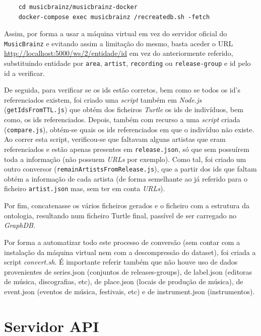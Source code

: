 \documentclass{article}
\begin{document}
\begin{framed}
\begin{verbatim}
    cd musicbrainz/musicbrainz-docker
    docker-compose exec musicbrainz /recreatedb.sh -fetch
\end{verbatim}
\end{framed}

Assim, por forma a usar a máquina virtual em vez do servidor oficial do \texttt{MusicBrainz} e evitando assim a limitação do mesmo, basta aceder o URL \url{http://localhost:5000/ws/2/entidade/id} em vez do anteriormente referido, substituindo entidade por \texttt{area}, \texttt{artist}, \texttt{recording} ou \texttt{release-group} e id pelo id a verificar.

De seguida, para verificar se os ids estão corretos, bem como se todos os id's referenciados existem, foi criado uma \textit{script} também em \textit{Node.js} (\texttt{getIdsFromTTL.js}) que obtém dos ficheiros \textit{Turtle} os ids de indivíduos, bem como, os ids referenciados. Depois, também com recurso a uma \textit{script} criada (\texttt{compare.js}), obtém-se quais os ids referenciados em que o indivíduo não existe. Ao correr esta script, verificou-se que faltavam alguns artistas que eram referenciados e estão apenas presentes em \texttt{release.json}, só que sem possuírem toda a informação (não possuem \textit{URLs} por exemplo). Como tal, foi criado um outro conversor (\texttt{remainArtistsFromRelease.js}), que a partir dos ids que faltam obtém a informação de cada artista (de forma semelhante ao já referido para o ficheiro \texttt{artist.json} mas, sem ter em conta \textit{URLs}).

Por fim, concatenasse os vários ficheiros gerados e o ficheiro com a estrutura da ontologia, resultando num ficheiro Turtle final, passível de ser carregado no \textit{GraphDB}.

Por forma a automatizar todo este processo de conversão (sem contar com a instalação da máquina virtual nem com a descompressão do dataset), foi criada a script \textit{convert.sh}. É importante referir também que não houve uso de dados provenientes de series.json (conjuntos de releases-groups), de label.json (editoras de música, discografias, etc), de place.json (locais de produção de música), de event.json (eventos de música, festivais, etc) e de instrument.json (instrumentos).

\section{Servidor API} \label{api}
\end{document}
